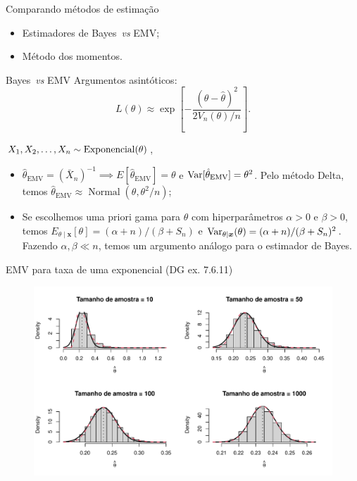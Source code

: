 \begin{frame}{Comparando métodos de estimação}
 \begin{itemize}
  \item Estimadores de Bayes~\textit{vs} EMV;
  \item Método dos momentos.
 \end{itemize}
\end{frame}

\begin{frame}{Bayes~\textit{vs} EMV}
Argumentos asintóticos:
  \begin{equation*}
   L(\theta) \approx \exp\left[-\frac{\left(\theta-\hat{\theta}\right)^2}{2V_n(\theta)/n} \right].
  \end{equation*}
 \begin{exemplo}
    $X_1, X_2, \ldots, X_n \sim \operatorname{Exponencial}(\theta)$, 
    \begin{itemize}
     \item   $\hat{\theta}_{\text{EMV}} = \left(\bar{X}_n\right)^{-1} \implies E[\hat{\theta}_{\text{EMV}}] = \theta$ e $\operatorname{Var}[\hat{\theta}_{\text{EMV}}] = \theta^2$.
  Pelo método Delta, temos $\hat{\theta}_{\text{EMV}} \approx \operatorname{Normal}(\theta, \theta^2/n)$;
    \item Se escolhemos uma priori gama para $\theta$ com hiperparâmetros $\alpha > 0$ e $\beta > 0$,    temos $E_{\theta \mid \boldsymbol{x}}[\theta] = (\alpha + n)/(\beta + S_n)$ e $\operatorname{Var}_{\theta \mid \boldsymbol{x}}(\theta) = (\alpha + n)/ (\beta + S_n)^2$.
    Fazendo $\alpha, \beta \ll n$, temos um argumento análogo para o estimador de Bayes.
    \end{itemize}  
 \end{exemplo}
\end{frame}


\begin{frame}{EMV para taxa de uma exponencial (DG ex. 7.6.11)}
\begin{figure}[!ht]
\label{fig:mle_exponential_deltaMethod}
\begin{center}
\includegraphics[scale=0.6]{figures/exponential_mle_deltaMethod.pdf} 
\end{center} 
\end{figure} 
\end{frame}

